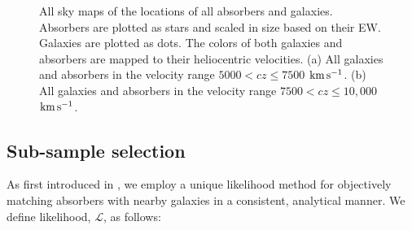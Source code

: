 \documentclass[twocolumn,tighten]{aastex62}
\newcommand{\kms}{$\rm km\, s^{-1}$}
\begin{document}
\begin{figure}
\centering
  \label{allsky_7500}
  \label{allsky_10000}
  \caption{\small{All sky maps of the locations of all absorbers and galaxies. Absorbers are plotted as stars and scaled in size based on their EW. Galaxies are plotted as dots. The colors of both galaxies and absorbers are mapped to their heliocentric velocities. (a) All galaxies and absorbers in the velocity range $5000 < cz \leq 7500$ \kms. (b) All galaxies and absorbers in the velocity range $7500 < cz \leq 10,000$ \kms.}}
\vspace{0pt}
\end{figure}




\subsection{Sub-sample selection}
As first introduced in \cite{french2017}, we employ a unique likelihood method for objectively matching absorbers with nearby galaxies in a consistent, analytical manner. We define likelihood, $\mathcal{L}$, as follows: 
\end{document}
